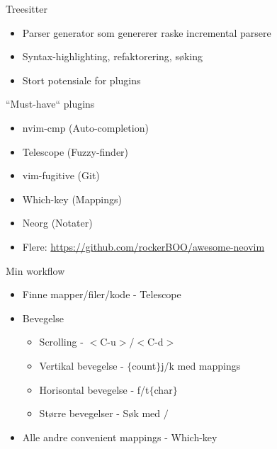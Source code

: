 \documentclass{beamer}
\begin{document}
\begin{frame}{Treesitter}
\begin{itemize}
    \item Parser generator som genererer raske incremental parsere
    \item Syntax-highlighting, refaktorering, søking
    \item Stort potensiale for plugins
\end{itemize}

\end{frame}

\begin{frame}{``Must-have`` plugins}
	\begin{itemize}
		\item nvim-cmp (Auto-completion)
		\item Telescope (Fuzzy-finder)
		\item vim-fugitive (Git)
        \item Which-key (Mappings)
		\item Neorg (Notater)
        \item Flere: \url{https://github.com/rockerBOO/awesome-neovim}
	\end{itemize}
\end{frame}

\begin{frame}{Min workflow}
    \begin{itemize}
        \item Finne mapper/filer/kode - Telescope
        \item Bevegelse
            \begin{itemize}
                \item Scrolling - $<$C-u$>$/$<$C-d$>$ 
                \item Vertikal bevegelse - $\{$count$\}$j/k med mappings
                \item Horisontal bevegelse - f/t$\{$char$\}$
                \item Større bevegelser - Søk med $/$
            \end{itemize}
        \item Alle andre convenient mappings - Which-key
    \end{itemize}
\end{frame}
\end{document}
